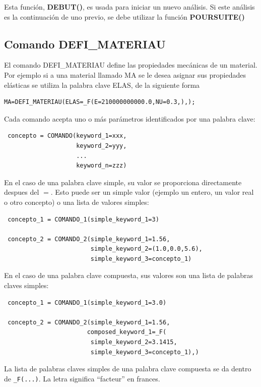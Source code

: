 \documentclass[12pt]{book}
\theoremstyle{definition}
\theoremstyle{remark}
\theoremstyle{plain}
\begin{document}
Esta función, \textbf{DEBUT()}, es usada para iniciar un nuevo análisis. Si este análisis es la 
continuación de uno previo, se debe utilizar la función \textbf{POURSUITE()}

\subsection{Comando DEFI\_MATERIAU}

El comando DEFI\_MATERIAU define las propiedades mecánicas de un material. Por ejemplo
si a una material llamado MA se le desea asignar sus propiedades elásticas se utiliza 
la palabra clave ELAS, de la siguiente forma

\begin{verbatim}
MA=DEFI_MATERIAU(ELAS=_F(E=210000000000.0,NU=0.3,),);
\end{verbatim}

Cada comando acepta uno o más parámetros identificados por una palabra clave:

\begin{verbatim}
 concepto = COMANDO(keyword_1=xxx,
                    keyword_2=yyy,
                    ...
                    keyword_n=zzz)
\end{verbatim}

En el caso de una palabra clave simple, su valor se proporciona directamente
despues del $=$. Esto puede ser un simple valor (ejemplo un entero, un valor real o
otro concepto) o una lista de valores simples:

\begin{verbatim}
 concepto_1 = COMANDO_1(simple_keyword_1=3)

 concepto_2 = COMANDO_2(simple_keyword_1=1.56,
                        simple_keyword_2=(1.0,0.0,5.6),
                        simple_keyword_3=concepto_1)
\end{verbatim}

En el caso de una palabra clave compuesta, sus valores son una lista de palabras claves
simples:

\begin{verbatim}
 concepto_1 = COMANDO_1(simple_keyword_1=3.0)

 concepto_2 = COMANDO_2(simple_keyword_1=1.56,
                       composed_keyword_1=_F(
                        simple_keyword_2=3.1415,
                        simple_keyword_3=concepto_1),)
\end{verbatim}

La lista de palabras claves simples de una palabra clave compuesta se da dentro de
\verb*|_F(...)|. La letra significa ``facteur'' en frances.
\end{document}
